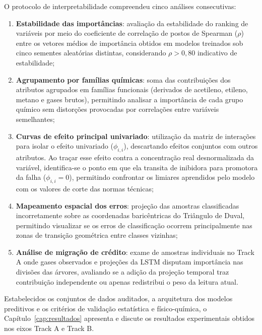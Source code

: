 O protocolo de interpretabilidade compreendeu cinco análises consecutivas:
\begin{enumerate}
    \item \textbf{Estabilidade das importâncias}: avaliação da estabilidade do ranking de variáveis por meio do coeficiente de correlação de postos de Spearman ($\rho$) entre os vetores médios de importância obtidos em modelos treinados sob cinco sementes aleatórias distintas, considerando $\rho > 0,80$ indicativo de estabilidade;
    \item \textbf{Agrupamento por famílias químicas}: soma das contribuições dos atributos agrupados em famílias funcionais (derivados de acetileno, etileno, metano e gases brutos), permitindo analisar a importância de cada grupo químico sem distorções provocadas por correlações entre variáveis semelhantes;
    \item \textbf{Curvas de efeito principal univariado}: utilização da matriz de interações para isolar o efeito univariado ($\phi_{i,i}$), descartando efeitos conjuntos com outros atributos. Ao traçar esse efeito contra a concentração real desnormalizada da variável, identifica-se o ponto em que ela transita de inibidora para promotora da falha ($\phi_{i,i} = 0$), permitindo confrontar os limiares aprendidos pelo modelo com os valores de corte das normas técnicas;
    \item \textbf{Mapeamento espacial dos erros}: projeção das amostras classificadas incorretamente sobre as coordenadas baricêntricas do Triângulo de Duval, permitindo visualizar se os erros de classificação ocorrem principalmente nas zonas de transição geométrica entre classes vizinhas;
    \item \textbf{Análise de migração de crédito}: exame de amostras individuais no Track A onde gases observados e projeções da LSTM disputam importância nas divisões das árvores, avaliando se a adição da projeção temporal traz contribuição independente ou apenas redistribui o peso da leitura atual.
\end{enumerate}

Estabelecidos os conjuntos de dados auditados, a arquitetura dos modelos preditivos e os critérios de validação estatística e físico-química, o Capítulo~\ref{cap:resultados} apresenta e discute os resultados experimentais obtidos nos eixos Track A e Track B.
